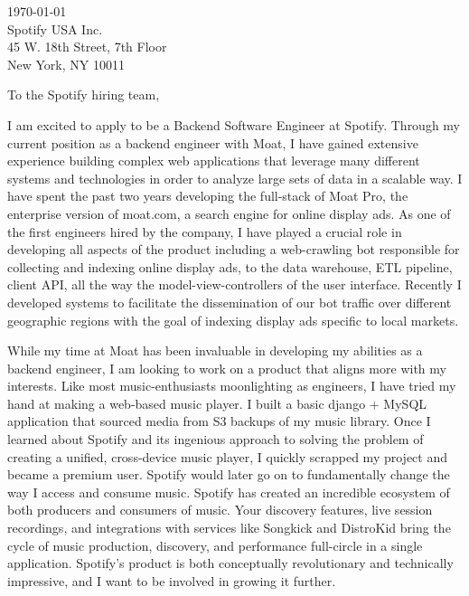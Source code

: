 \documentclass[]{deedy-resume-openfont}
\begin{document}
{}

\raggedright
\vspace{1in}
\today\\
\vspace{10 mm}
Spotify USA Inc.\\
45 W. 18th Street, 7th Floor\\
New York, NY 10011\\
\vspace{10 mm}

To the Spotify hiring team,\\
\vspace{4 mm}

I am excited to apply to be a Backend Software Engineer at Spotify. Through my current position as a backend engineer with Moat, I have gained extensive experience building complex web applications that leverage many different systems and technologies in order to analyze large sets of data in a scalable way. I have spent the past two years developing the full-stack of Moat Pro, the enterprise version of moat.com, a search engine for online display ads. As one of the first engineers hired by the company, I have played a crucial role in developing all aspects of the product including a web-crawling bot responsible for collecting and indexing online display ads, to the data warehouse, ETL pipeline, client API, all the way the model-view-controllers of the user interface. Recently I developed systems to facilitate the dissemination of our bot traffic over different geographic regions with the goal of indexing display ads specific to local markets.
\vspace{4 mm}

While my time at Moat has been invaluable in developing my abilities as a backend engineer, I am looking to work on a product that aligns more with my interests. Like most music-enthusiasts moonlighting as engineers, I have tried my hand at making a web-based music player. I built a basic django + MySQL application that sourced media from S3 backups of my music library. Once I learned about Spotify and its ingenious approach to solving the problem of creating a unified, cross-device music player, I quickly scrapped my project and became a premium user. Spotify would later go on to fundamentally change the way I access and consume music. Spotify has created an incredible ecosystem of both producers and consumers of music. Your discovery features, live session recordings, and integrations with services like Songkick and DistroKid bring the cycle of music production, discovery, and performance full-circle in a single application. Spotify’s product is both conceptually revolutionary and technically impressive, and I want to be involved in growing it further.
\vspace{4 mm}
\end{document}
